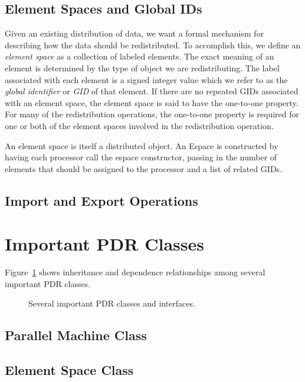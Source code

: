 \documentclass[10pt,relax]{PetraObjectModel}
\begin{document}
\subsection{Element Spaces and Global IDs}

Given an existing distribution of data, we want a formal mechanism for describing
how the data should be redistributed.  To accomplish this, we define an
{\it element space} as a collection of labeled elements.  The exact meaning of
an element is determined by the type of object we are redistributing.
The label associated with each element is a signed integer value which we refer to as
the {\it global identifier} or {\it GID} of that element.  If there are no
repeated GIDs associated with an element space, the element space is said to
have the one-to-one property.  For many of the redistribution operations, the
one-to-one property is required for one or both of the element spaces involved
in the redistribution operation.

An element space is itself a distributed object.  An Espace is constructed by
having each processor call the espace constructor, passing in the number of
elements that should be assigned to the processor and a list of related GIDs.

\subsection{Import and Export Operations}

\section{Important PDR Classes}

Figure~\ref{importfigure} shows inheritance and dependence relationships among
several important PDR classes.
\begin{figure}[ht]
\begin{center}
\caption{Several important PDR classes and interfaces.}
\label{importfigure}
\end{center}
\end{figure}

\subsection{Parallel Machine Class}

\subsection{Element Space Class}
\end{document}
